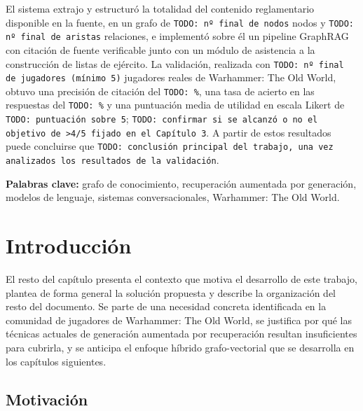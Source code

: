 \documentclass[11pt,a4paper,spanish]{book}
\numberwithin{equation}{chapter}
\numberwithin{figure}{chapter}
\numberwithin{table}{chapter}
\begin{document}
El sistema extrajo y estructuró la totalidad del contenido reglamentario disponible en la fuente, en un grafo de \texttt{TODO: nº final de nodos} nodos y \texttt{TODO: nº final de aristas} relaciones, e implementó sobre él un pipeline GraphRAG con citación de fuente verificable junto con un módulo de asistencia a la construcción de listas de ejército. La validación, realizada con \texttt{TODO: nº final de jugadores (mínimo 5)} jugadores reales de Warhammer: The Old World, obtuvo una precisión de citación del \texttt{TODO: \%}, una tasa de acierto en las respuestas del \texttt{TODO: \%} y una puntuación media de utilidad en escala Likert de \texttt{TODO: puntuación sobre 5}; \texttt{TODO: confirmar si se alcanzó o no el objetivo de >4/5 fijado en el Capítulo 3}. A partir de estos resultados puede concluirse que \texttt{TODO: conclusión principal del trabajo, una vez analizados los resultados de la validación}.

{\bf Palabras clave:} grafo de conocimiento, recuperación aumentada por generación, modelos de lenguaje, sistemas conversacionales, Warhammer: The Old World.


\mainmatter

\chapter{Introducción}

El resto del capítulo presenta el contexto que motiva el desarrollo de este trabajo, plantea de forma general la solución propuesta y describe la organización del resto del documento. Se parte de una necesidad concreta identificada en la comunidad de jugadores de Warhammer: The Old World, se justifica por qué las técnicas actuales de generación aumentada por recuperación resultan insuficientes para cubrirla, y se anticipa el enfoque híbrido grafo-vectorial que se desarrolla en los capítulos siguientes.

\section{Motivación}
\end{document}
